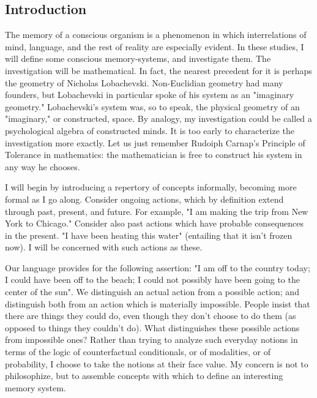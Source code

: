 \documentclass[10pt,twoside,draft]{memoir}
\begin{document}
{\subsection{Introduction}

The memory of a conscious organism is a phenomenon in which 
interrelations of mind, language, and the rest of reality are especially evident. 
In these studies, I will define some conscious memory-systems, and 
investigate them. The investigation will be mathematical. In fact, the nearest 
precedent for it is perhaps the geometry of Nicholas Lobachevski. 
Non-Euclidian geometry had many founders, but Lobachevski in particular 
spoke of his system as an "imaginary geometry." Lobachevski's system was, 
so to speak, the physical geometry of an "imaginary," or constructed, space. 
By analogy, my investigation could be called a psychological algebra of 
constructed minds. It is too early to characterize the investigation more 
exactly. Let us just remember Rudoiph Carnap's Principle of Tolerance in 
mathematics: the mathematician is free to construct his system in any way 
he chooses. 

I will begin by introducing a repertory of concepts informally, 
becoming more formal as I go along. Consider ongoing actions, which by 
definition extend through past, present, and future. For example, "I am 
making the trip from New York to Chicago." Consider also past actions 
which have probable consequences in the present. "I have been heating this 
water" (entailing that it isn't frozen now). I will be concerned with such 
actions as these. 

Our language provides for the following assertion: "I am off to the 
country today; I could have been off to the beach; I could not possibly have 
been going to the center of the sun". We distinguish an actual action from a 
possible action; and distinguish both from an action which is materially 
impossible. People insist that there are things they could do, even though 
they don't choose to do them (as opposed to things they couldn't do). What 
distinguishes these possible actions from impossible ones? Rather than 
trying to analyze such everyday notions in terms of the logic of 
counterfactual conditionals, or of modalities, or of probability, I choose to 
take the notions at their face value. My concern is not to philosophize, but 
to assemble concepts with which to define an interesting memory system. 

}
\end{document}

